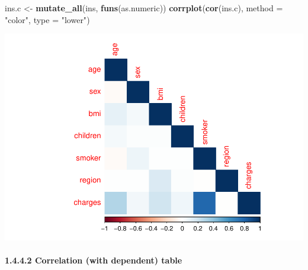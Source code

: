 \documentclass[]{article}
\newenvironment{Shaded}{\begin{snugshade}}{\end{snugshade}}
\newcommand{\KeywordTok}[1]{\textcolor[rgb]{0.13,0.29,0.53}{\textbf{#1}}}
\newcommand{\DataTypeTok}[1]{\textcolor[rgb]{0.13,0.29,0.53}{#1}}
\newcommand{\DecValTok}[1]{\textcolor[rgb]{0.00,0.00,0.81}{#1}}
\newcommand{\StringTok}[1]{\textcolor[rgb]{0.31,0.60,0.02}{#1}}
\newcommand{\ControlFlowTok}[1]{\textcolor[rgb]{0.13,0.29,0.53}{\textbf{#1}}}
\newcommand{\OperatorTok}[1]{\textcolor[rgb]{0.81,0.36,0.00}{\textbf{#1}}}
\newcommand{\NormalTok}[1]{#1}
\let\oldparagraph\paragraph
\renewcommand{\paragraph}[1]{\oldparagraph{#1}\mbox{}}
\begin{document}
\begin{Shaded}
\begin{Highlighting}[]
\NormalTok{ins.c <-}\StringTok{ }\KeywordTok{mutate_all}\NormalTok{(ins, }\KeywordTok{funs}\NormalTok{(as.numeric))}
\KeywordTok{corrplot}\NormalTok{(}\KeywordTok{cor}\NormalTok{(ins.c), }\DataTypeTok{method =} \StringTok{"color"}\NormalTok{, }\DataTypeTok{type =} \StringTok{"lower"}\NormalTok{)}
\end{Highlighting}
\end{Shaded}

\includegraphics{DATA_605_Discussion_11_files/figure-latex/summary-correlation-heatmap-1.pdf}

\paragraph{1.4.4.2 Correlation (with dependent)
table}\label{correlation-with-dependent-table}

\begin{Shaded}
\end{Shaded}
\end{document}
